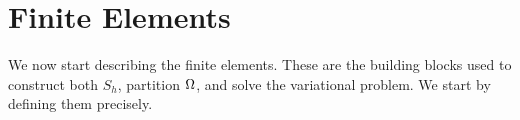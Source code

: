 \section{Finite Elements}
We now start describing the finite elements. These are the building blocks 
used to construct both $S_h$, partition $\Omega$, and solve the variational problem.
We start by defining them precisely.



